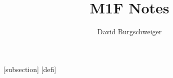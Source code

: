 

\author{David Burgschweiger}
\title{M1F Notes}

\geometry{verbose,a4paper,tmargin=2.5cm,bmargin=2.5cm,lmargin=2cm,rmargin=2cm}

\pagestyle{fancy}
\rhead{\thepage}
\cfoot{}

\setlength{\lightrulewidth }{0.01em}
\setlength{\heavyrulewidth }{0.1em}

\theoremstyle{definition}

[subsection]
[defi]


\newtheorem{lm}{Lemma}[section]				%
\newtheorem{ex}{Example}	%
\newtheorem{df}{Definition }[section] %
\newtheorem{tm}{Theorem}[section] %
\newtheorem*{rk}{Remark} %
\newtheorem*{ec}{Exercise} %
\newtheorem{ax}{Axiom}[section] %
\newtheorem{cl}{Corollary}[section]
\newtheorem{pp}{Proposition}
\newtheorem*{nt}{Notation}
\newtheorem*{qu}{Question}
\newtheorem{pr}{Property}[defi]
\newtheorem{rt}{Result}[subsection]

\newenvironment{nex}{\noindent\ignorespaces\begin{ex} \begin{itemize}}{\end{itemize}\end{ex}}
\newenvironment{itemal}{\hfill \begin{math} \begin{aligned}[t]} {\end{aligned} \end{math} \hfill\null\\ \\}
\newenvironment{an}{\noindent\ignorespaces\textit{Answer.}}{\hfill \qed}






\newcommand{\R}{\mathbb R}
\newcommand{\N}{\mathbb N}
\newcommand{\Q}{\mathbb Q}
\newcommand{\C}{\mathbb C}
\newcommand{\Z}{\mathbb Z}
\newcommand{\hcf}{\operatorname{hcf}}
\newcommand{\ord}{\operatorname{ord}}
\newcommand{\dom}{\operatorname{dom}}
\newcommand{\image}{\operatorname{image}}
\newcommand{\range}{\operatorname{range}}
\newcommand{\id}{\operatorname{id}}



\newcolumntype {+}{>{\global\let\currentrowstyle\relax}}
\newcolumntype {^}{>{\currentrowstyle}}
\newcommand{\rowstyle}[1]{\gdef\currentrowstyle {#1} %
	#1\ignorespaces
}


